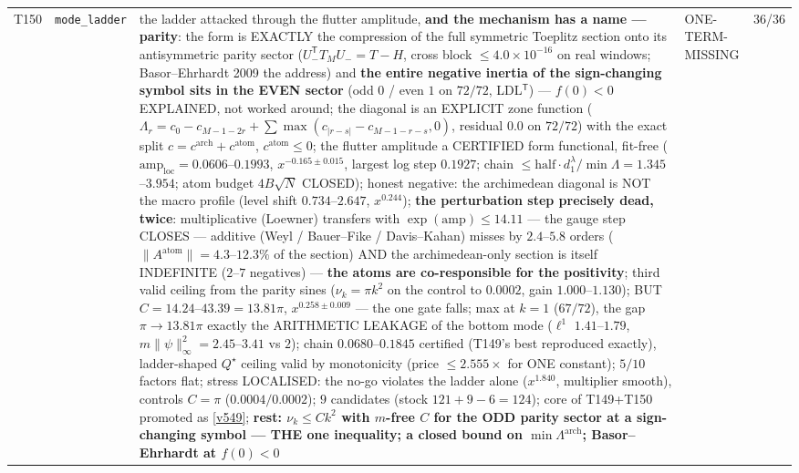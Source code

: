 \documentclass[11pt,a4paper]{article}
\begin{document}
{\begin{xltabular}{\linewidth}{@{}p{0.95cm} >{\raggedright\arraybackslash}p{3.1cm} Y >{\raggedright\scriptsize\arraybackslash}p{3.35cm} p{1.15cm}@{}}
T150 & \texttt{\scriptsize mode\_\allowbreak ladder} & the ladder attacked through the flutter amplitude, \textbf{and the mechanism has a name --- parity}: the form is EXACTLY the compression of the full symmetric Toeplitz section onto its antisymmetric parity sector ($U_-^{\mathsf T}T_MU_-=T-H$, cross block $\le4.0\times10^{-16}$ on real windows; Basor--Ehrhardt 2009 the address) and \textbf{the entire negative inertia of the sign-changing symbol sits in the EVEN sector} (odd $0$ / even $1$ on $72/72$, LDL$^{\mathsf T}$) --- $f(0)<0$ EXPLAINED, not worked around; the diagonal is an EXPLICIT zone function ($\Lambda_r=c_0-c_{M-1-2r}+\sum\max(c_{|r-s|}-c_{M-1-r-s},0)$, residual $0.0$ on $72/72$) with the exact split $c=c^{\mathrm{arch}}+c^{\mathrm{atom}}$, $c^{\mathrm{atom}}\le0$; the flutter amplitude a CERTIFIED form functional, fit-free ($\mathrm{amp}_{\mathrm{loc}}=0.0606$--$0.1993$, $x^{-0.165\pm0.015}$, largest log step $0.1927$; chain $\le\mathrm{half}\cdot d_1^\lambda/\min\Lambda=1.345$--$3.954$; atom budget $4B\sqrt N$ CLOSED); honest negative: the archimedean diagonal is NOT the macro profile (level shift $0.734$--$2.647$, $x^{0.244}$); \textbf{the perturbation step precisely dead, twice}: multiplicative (Loewner) transfers with $\exp(\mathrm{amp})\le14.11$ --- the gauge step CLOSES --- additive (Weyl / Bauer--Fike / Davis--Kahan) misses by $2.4$--$5.8$ orders ($\|A^{\mathrm{atom}}\|=4.3$--$12.3\%$ of the section) AND the archimedean-only section is itself INDEFINITE ($2$--$7$ negatives) --- \textbf{the atoms are co-responsible for the positivity}; third valid ceiling from the parity sines ($\nu_k=\pi k^2$ on the control to $0.0002$, gain $1.000$--$1.130$); BUT $C=14.24$--$43.39=13.81\pi$, $x^{0.258\pm0.009}$ --- the one gate falls; max at $k=1$ ($67/72$), the gap $\pi\to13.81\pi$ exactly the ARITHMETIC LEAKAGE of the bottom mode ($\ell^1$ $1.41$--$1.79$, $m\|\psi\|_\infty^2=2.45$--$3.41$ vs $2$); chain $0.0680$--$0.1845$ certified (T149's best reproduced exactly), ladder-shaped $Q^\star$ ceiling valid by monotonicity (price $\le2.555\times$ for ONE constant); $5/10$ factors flat; stress LOCALISED: the no-go violates the ladder alone ($x^{1.840}$, multiplier smooth), controls $C=\pi$ ($0.0004/0.0002$); $9$ candidates (stock $121+9-6=124$); core of T149+T150 promoted as \vref{v549}; \textbf{rest: $\nu_k\le Ck^2$ with $m$-free $C$ for the ODD parity sector at a sign-changing symbol --- THE one inequality; a closed bound on $\min\Lambda^{\mathrm{arch}}$; Basor--Ehrhardt at $f(0)<0$} & ONE-TERM-MISSING & 36/36\\

\end{xltabular}}
\end{document}
